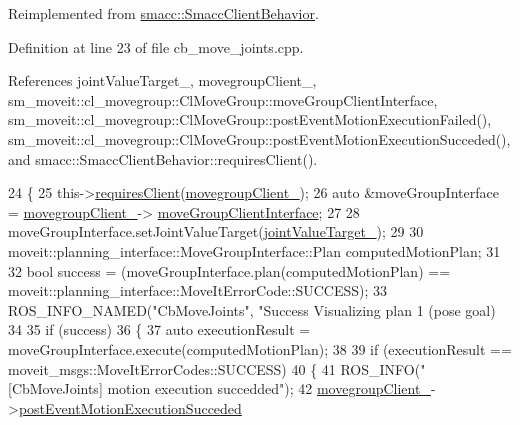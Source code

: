 Reimplemented from \hyperlink{classsmacc_1_1SmaccClientBehavior_a7962382f93987c720ad432fef55b123f}{smacc\+::\+Smacc\+Client\+Behavior}.



Definition at line 23 of file cb\+\_\+move\+\_\+joints.\+cpp.



References joint\+Value\+Target\+\_\+, movegroup\+Client\+\_\+, sm\+\_\+moveit\+::cl\+\_\+movegroup\+::\+Cl\+Move\+Group\+::move\+Group\+Client\+Interface, sm\+\_\+moveit\+::cl\+\_\+movegroup\+::\+Cl\+Move\+Group\+::post\+Event\+Motion\+Execution\+Failed(), sm\+\_\+moveit\+::cl\+\_\+movegroup\+::\+Cl\+Move\+Group\+::post\+Event\+Motion\+Execution\+Succeded(), and smacc\+::\+Smacc\+Client\+Behavior\+::requires\+Client().


\begin{DoxyCode}
24 \{
25     this->\hyperlink{classsmacc_1_1SmaccClientBehavior_a917f001e763a1059af337bf4e164f542}{requiresClient}(\hyperlink{classsm__moveit_1_1cl__movegroup_1_1CbMoveJoints_a3994694b9e783bc376e3eabffc214001}{movegroupClient\_});
26     \textcolor{keyword}{auto} &moveGroupInterface = \hyperlink{classsm__moveit_1_1cl__movegroup_1_1CbMoveJoints_a3994694b9e783bc376e3eabffc214001}{movegroupClient\_}->
      \hyperlink{classsm__moveit_1_1cl__movegroup_1_1ClMoveGroup_a23acf6883455566dbab30e4367c2144d}{moveGroupClientInterface};
27 
28     moveGroupInterface.setJointValueTarget(\hyperlink{classsm__moveit_1_1cl__movegroup_1_1CbMoveJoints_a86f4b67097288bcf5ccbe615751705d7}{jointValueTarget\_});
29 
30     moveit::planning\_interface::MoveGroupInterface::Plan computedMotionPlan;
31 
32     \textcolor{keywordtype}{bool} success = (moveGroupInterface.plan(computedMotionPlan) == 
      moveit::planning\_interface::MoveItErrorCode::SUCCESS);
33     ROS\_INFO\_NAMED(\textcolor{stringliteral}{"CbMoveJoints"}, \textcolor{stringliteral}{"Success Visualizing plan 1 (pose goal) %
34 
35     \textcolor{keywordflow}{if} (success)
36     \{
37         \textcolor{keyword}{auto} executionResult = moveGroupInterface.execute(computedMotionPlan);
38 
39         \textcolor{keywordflow}{if} (executionResult == moveit\_msgs::MoveItErrorCodes::SUCCESS)
40         \{
41             ROS\_INFO(\textcolor{stringliteral}{"[CbMoveJoints] motion execution succedded"});
42             \hyperlink{classsm__moveit_1_1cl__movegroup_1_1CbMoveJoints_a3994694b9e783bc376e3eabffc214001}{movegroupClient\_}->\hyperlink{classsm__moveit_1_1cl__movegroup_1_1ClMoveGroup_ab4585dcd850286ed168a25a3ddd56eed}{postEventMotionExecutionSucceded}
}
\end{DoxyCode}
